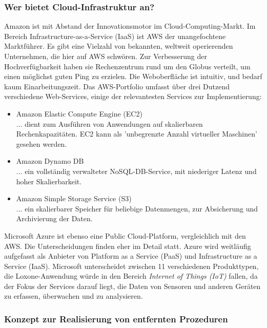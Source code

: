 \documentclass[letterpaper, 12pt]{article}
\let\tempsubsubsection\subsubsection
\renewcommand\subsubsection[1]{\vspace{0cm}\tempsubsubsection{#1}\vspace{0cm}}
\begin{document}
\subsubsection{Wer bietet Cloud-Infrastruktur an?}


Amazon ist mit Abstand der Innovationsmotor im Cloud-Computing-Markt. Im Bereich Infrastructure-as-a-Service (IaaS) ist AWS der unangefochtene Marktführer. Es gibt eine Vielzahl von bekannten, weltweit operierenden Unternehmen, die hier auf AWS schwören. Zur Verbesserung der Hochverfügbarkeit haben sie Rechenzentrum rund um den Globus verteilt, um einen möglichst guten Ping zu erzielen. Die Weboberfläche ist intuitiv, und bedarf kaum Einarbeitungszeit. Das AWS-Portfolio umfasst über drei Dutzend verschiedene Web-Services, einige der relevantesten Services zur Implementierung:

\begin{itemize}
	\item Amazon Elastic Compute Engine (EC2) \\
		... dient zum Ausführen von Anwendungen auf skalierbaren Rechenkapazitäten. EC2 kann als 'unbegrenzte Anzahl virtueller Maschinen' gesehen werden. 
	\clearpage
	\item Amazon Dynamo DB \\
	... ein vollständig verwalteter NoSQL-DB-Service, mit niederiger Latenz und hoher Skalierbarkeit.
	\item Amazon Simple Storage Service (S3) \\
	... ein skalierbarer Speicher für beliebige Datenmengen, zur Absicherung und Archivierung der Daten. \cite{aws}
\end{itemize}


Microsoft Azure ist ebenso eine Public Cloud-Platform, vergleichlich mit den AWS. Die Unterscheidungen finden eher im Detail statt. Azure wird weitläufig aufgefasst als Anbieter von Platform as a Service (PaaS) und Infrastructure as a Service (IaaS). Microsoft unterscheidet zwischen 11 verschiedenen Produkttypen, die Loxone-Anwendung würde in den Bereich \textit{Internet of Things (IoT)} fallen, da der Fokus der Services darauf liegt, die Daten von Sensoren und anderen Geräten zu erfassen, überwachen und zu analysieren.

\subsubsection{Konzept zur Realisierung von entfernten Prozeduren}
\end{document}
